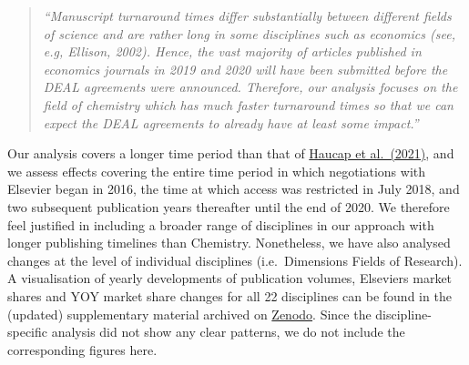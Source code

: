 \documentclass[
]{article}
\begin{document}
\begin{quote}
\emph{``Manuscript turnaround times differ substantially between different fields of science and are rather long in some disciplines such as economics (see, e.g, Ellison, 2002). Hence, the vast majority of articles published in economics journals in 2019 and 2020 will have been submitted before the DEAL agreements were announced. Therefore, our analysis focuses on the field of chemistry which has much faster turnaround times so that we can expect the DEAL agreements to already have at least some impact.''}
\end{quote}

Our analysis covers a longer time period than that of \href{https://doi.org/10.1002/mde.3493}{Haucap et al.~(2021)}, and we assess effects covering the entire time period in which negotiations with Elsevier began in 2016, the time at which access was restricted in July 2018, and two subsequent publication years thereafter until the end of 2020. We therefore feel justified in including a broader range of disciplines in our approach with longer publishing timelines than Chemistry. Nonetheless, we have also analysed changes at the level of individual disciplines (i.e.~Dimensions Fields of Research). A visualisation of yearly developments of publication volumes, Elsevier\textquotesingle s market shares and YOY market share changes for all 22 disciplines can be found in the (updated) supplementary material archived on \href{https://doi.org/10.5281/zenodo.4771575}{Zenodo}. Since the discipline-specific analysis did not show any clear patterns, we do not include the corresponding figures here.
\end{document}

